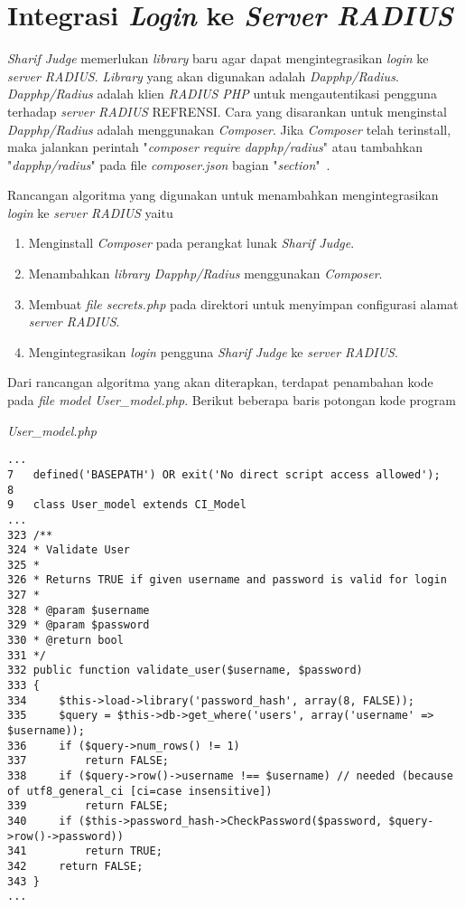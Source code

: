 \section{Integrasi \textit{Login} ke \textit{Server RADIUS}}
\textit{Sharif Judge} memerlukan \textit{library} baru agar dapat mengintegrasikan \textit{login} ke \textit{server RADIUS}. \textit{Library} yang akan digunakan adalah \textit{Dapphp/Radius}. \textit{Dapphp/Radius} adalah klien \textit{RADIUS PHP} untuk mengautentikasi pengguna terhadap \textit{server RADIUS} REFRENSI. Cara yang disarankan untuk menginstal \textit{Dapphp/Radius} adalah menggunakan \textit{Composer}. Jika \textit{Composer} telah terinstall, maka jalankan perintah "\textit{composer require dapphp/radius}" atau tambahkan "\textit{dapphp/radius}" pada file \textit{composer.json} bagian "\textit{section}"~\cite{drew:16:radius}.

Rancangan algoritma yang digunakan untuk menambahkan mengintegrasikan \textit{login} ke \textit{server RADIUS} yaitu
\begin{enumerate}
	\item Menginstall \textit{Composer} pada perangkat lunak \textit{Sharif Judge}.
	\item Menambahkan \textit{library Dapphp/Radius} menggunakan \textit{Composer}.
	\item Membuat \textit{file secrets.php} pada direktori  untuk menyimpan configurasi alamat \textit{server RADIUS}.
	\item Mengintegrasikan \textit{login} pengguna \textit{Sharif Judge} ke \textit{server RADIUS}.
\end{enumerate}

Dari rancangan algoritma yang akan diterapkan, terdapat penambahan kode pada \textit{file model User\_model.php}. Berikut beberapa baris potongan kode program

\textit{User\_model.php}
\begin{lstlisting}[basicstyle=\ttfamily, frame=single,
columns=fullflexible, keepspaces=true, breaklines=true]
...
7	defined('BASEPATH') OR exit('No direct script access allowed');
8
9	class User_model extends CI_Model
...
323	/**
324	* Validate User
325	*
326	* Returns TRUE if given username and password is valid for login
327	*
328	* @param $username
329	* @param $password
330	* @return bool
331	*/
332	public function validate_user($username, $password)
333	{
334		$this->load->library('password_hash', array(8, FALSE));
335		$query = $this->db->get_where('users', array('username' => $username));
336		if ($query->num_rows() != 1)
337			return FALSE;
338		if ($query->row()->username !== $username) // needed (because of utf8_general_ci [ci=case insensitive])
339			return FALSE;
340		if ($this->password_hash->CheckPassword($password, $query->row()->password))
341			return TRUE;
342		return FALSE;
343	}
...
\end{lstlisting}

